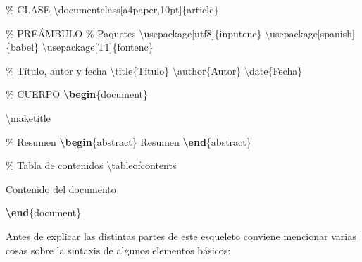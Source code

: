 \documentclass[
  spanish,
  a4paper,
]{scrreport}
\newenvironment{Shaded}{\begin{snugshade}}{\end{snugshade}}
\newcommand{\BuiltInTok}[1]{\textcolor[rgb]{0.00,0.23,0.31}{#1}}
\newcommand{\CommentTok}[1]{\textcolor[rgb]{0.37,0.37,0.37}{#1}}
\newcommand{\ExtensionTok}[1]{\textcolor[rgb]{0.00,0.23,0.31}{#1}}
\newcommand{\FunctionTok}[1]{\textcolor[rgb]{0.28,0.35,0.67}{#1}}
\newcommand{\KeywordTok}[1]{\textcolor[rgb]{0.00,0.23,0.31}{\textbf{#1}}}
\newcommand{\NormalTok}[1]{\textcolor[rgb]{0.00,0.23,0.31}{#1}}
\theoremstyle{definition}
\theoremstyle{remark}
\begin{document}
\begin{Shaded}
\begin{Highlighting}[]
\CommentTok{\% CLASE}
\BuiltInTok{\textbackslash{}documentclass}\NormalTok{[a4paper,10pt]\{}\ExtensionTok{article}\NormalTok{\}}

\CommentTok{\% PREÁMBULO}
\CommentTok{\% Paquetes}
\BuiltInTok{\textbackslash{}usepackage}\NormalTok{[utf8]\{}\ExtensionTok{inputenc}\NormalTok{\}}
\BuiltInTok{\textbackslash{}usepackage}\NormalTok{[spanish]\{}\ExtensionTok{babel}\NormalTok{\}}
\BuiltInTok{\textbackslash{}usepackage}\NormalTok{[T1]\{}\ExtensionTok{fontenc}\NormalTok{\}}

\CommentTok{\% Título, autor y fecha}
\FunctionTok{\textbackslash{}title}\NormalTok{\{Título\}}
\FunctionTok{\textbackslash{}author}\NormalTok{\{Autor\}}
\FunctionTok{\textbackslash{}date}\NormalTok{\{Fecha\}}

\CommentTok{\% CUERPO}
\KeywordTok{\textbackslash{}begin}\NormalTok{\{}\ExtensionTok{document}\NormalTok{\}}

\FunctionTok{\textbackslash{}maketitle}

\CommentTok{\% Resumen}
\KeywordTok{\textbackslash{}begin}\NormalTok{\{}\ExtensionTok{abstract}\NormalTok{\}}
\NormalTok{Resumen}
\KeywordTok{\textbackslash{}end}\NormalTok{\{}\ExtensionTok{abstract}\NormalTok{\}}

\CommentTok{\% Tabla de contenidos}
\FunctionTok{\textbackslash{}tableofcontents}

\NormalTok{Contenido del documento}

\KeywordTok{\textbackslash{}end}\NormalTok{\{}\ExtensionTok{document}\NormalTok{\}}
\end{Highlighting}
\end{Shaded}

Antes de explicar las distintas partes de este esqueleto conviene
mencionar varias cosas sobre la sintaxis de algunos elementos básicos:
\end{document}
